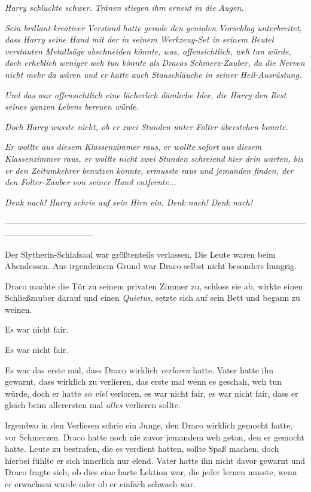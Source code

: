 {\emph{Harry schluckte schwer. Tränen stiegen ihm erneut in die Augen.}

\emph{Sein brillant-kreativer Verstand hatte gerade den genialen Vorschlag unterbreitet, dass Harry seine Hand mit der in seinem Werkzeug-Set in seinem Beutel verstauten Metallsäge abschneiden könnte, was, offensichtlich, weh tun würde, doch erheblich weniger weh tun könnte als Dracos Schmerz-Zauber, da die Nerven nicht mehr da wären und er hatte auch Stauschläuche in seiner Heil-Ausrüstung.}

\emph{Und das war offensichtlich eine lächerlich dämliche Idee, die Harry den Rest seines ganzen Lebens bereuen würde.}

\emph{Doch Harry wusste nicht, ob er zwei Stunden unter Folter überstehen konnte.}

\emph{Er wollte aus diesem Klassenzimmer} \emph{\emph{raus,}} \emph{er wollte} \emph{\emph{sofort}} \emph{aus diesem Klassenzimmer raus, er wollte nicht zwei Stunden schreiend hier drin warten, bis er den Zeitumkehrer benutzen konnte,} \emph{er\emph{musste raus}} \emph{und jemanden finden, der den Folter-Zauber von seiner Hand entfernte...}

\emph{\emph{Denk nach!}} \emph{Harry schrie auf sein Hirn ein.} \emph{\emph{Denk nach! Denk nach!}}

--------------------------------------------------------------------------------------------------------------------------------------------

\hfill\break Der Slytherin-Schlafsaal war größtenteils verlassen. Die Leute waren beim Abendessen. Aus irgendeinem Grund war Draco selbst nicht besonders hungrig.

Draco machte die Tür zu seinem privaten Zimmer zu, schloss sie ab, wirkte einen Schließzauber darauf und einen \emph{Quietus,} setzte sich auf sein Bett und begann zu weinen.

Es war nicht fair.

Es war nicht fair.

Es war das erste mal, dass Draco wirklich \emph{verloren} hatte, Vater hatte ihn gewarnt, dass wirklich zu verlieren, das erste mal wenn es geschah, weh tun würde, doch er hatte \emph{so viel} verloren, es war nicht fair, es war nicht fair, dass er gleich beim allerersten mal \emph{alles} verlieren sollte.

Irgendwo in den Verliesen schrie ein Junge, den Draco wirklich gemocht hatte, vor Schmerzen. Draco hatte noch nie zuvor jemandem weh getan, den er gemocht hatte. Leute zu bestrafen, die es verdient hatten, sollte Spaß machen, doch hierbei fühlte er sich innerlich nur elend. Vater hatte ihn nicht davor gewarnt und Draco fragte sich, ob dies eine harte Lektion war, die jeder lernen musste, wenn er erwachsen wurde oder ob er einfach schwach war.

}
